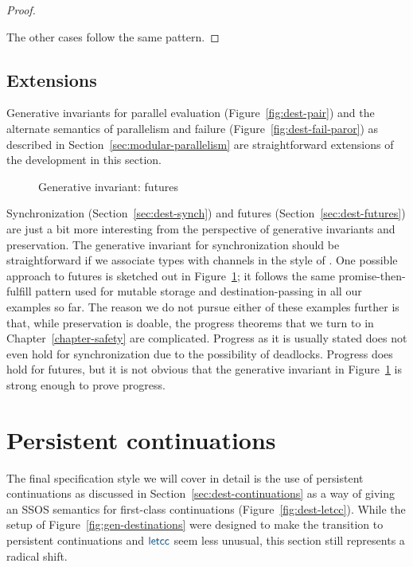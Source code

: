 \begin{proof}
\begin{description}
\medskip

\end{description}

\noindent
The other cases follow the same pattern.
\end{proof}

\subsection{Extensions}

Generative invariants for parallel evaluation
(Figure~\ref{fig:dest-pair}) and the alternate semantics of
parallelism and failure (Figure~\ref{fig:dest-fail-paror}) as
described in Section~\ref{sec:modular-parallelism} are
straightforward extensions of the development in this section.

\begin{figure}[tp]
\caption{Generative invariant: futures}
\label{fig:gen-future} 
\end{figure}

Synchronization (Section~\ref{sec:dest-synch}) and futures
(Section~\ref{sec:dest-futures}) are just a bit more interesting from
the perspective of generative invariants and preservation. The
generative invariant for synchronization should be straightforward if
we associate types with channels in the style of \cite[Section
41.5]{harper12practical}. One possible approach to futures is sketched
out in Figure~\ref{fig:gen-future}; it follows the same
promise-then-fulfill pattern used for mutable storage and
destination-passing in all our examples so far. The reason we do not
pursue either of these examples further is that, while preservation is
doable, the progress theorems that we turn to in
Chapter~\ref{chapter-safety} are complicated. Progress as it is
usually stated does not even hold for 
synchronization due to the possibility of deadlocks. Progress does
hold for futures, but it is not obvious that the generative invariant
in Figure~\ref{fig:gen-future} is strong enough to prove progress.


\section{Persistent continuations}
\label{sec:gen-letcc}

The final specification style we will cover in detail is the use of
persistent continuations as discussed in
Section~\ref{sec:dest-continuations} as a way of giving an SSOS
semantics for first-class continuations (Figure~\ref{fig:dest-letcc}).
While the setup of Figure~\ref{fig:gen-destinations} were designed to
make the transition to persistent continuations and $\obj{\sf letcc}$
seem less unusual, this section still represents a radical shift.  

